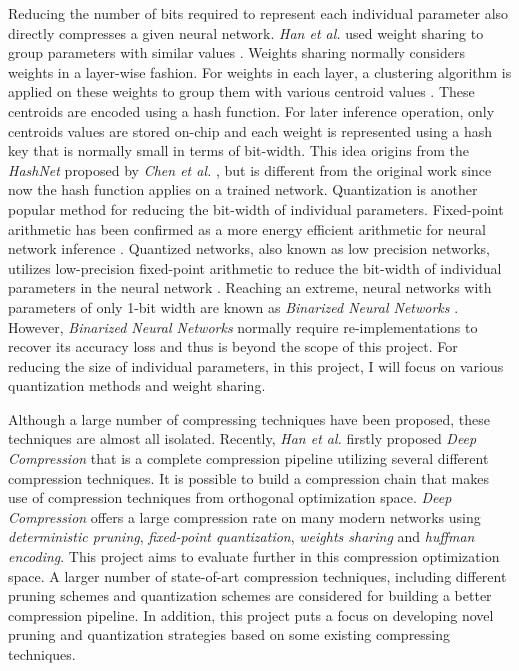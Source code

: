 \documentclass[a4paper,12pt]{report}
\begin{document}
Reducing the number of bits required to represent each individual parameter also
directly compresses a given neural network.
\textit{Han et al.} used weight sharing to group parameters with similar values \cite{Han15}.
Weights sharing normally considers weights in a layer-wise fashion.
For weights in each layer, a clustering algorithm is applied on these
weights to group them with various centroid values \cite{Han15}.
These centroids are encoded using a hash function.
For later inference operation, only centroids values are stored on-chip and
each weight is represented using a hash key that is normally small in terms of
bit-width.
This idea origins from the \textit{HashNet} proposed by \textit{Chen et al.} \cite{chen2015compressing},
but is different from the original work since now the hash function applies on a trained network.
Quantization is another popular method for reducing the bit-width of individual parameters.
Fixed-point arithmetic has been confirmed as a more energy efficient arithmetic
for neural network inference \cite{moons2016energy}.
Quantized networks, also known as low precision networks, utilizes low-precision
fixed-point arithmetic to reduce the bit-width of individual parameters in the
neural network \cite{Hubara}.
Reaching an extreme, neural networks with parameters of only 1-bit width are
known as \textit{Binarized Neural Networks} \cite{Courbariaux}.
However, \textit{Binarized Neural Networks} normally require re-implementations to recover
its accuracy loss and thus is beyond the scope of this project.
For reducing the size of individual parameters, in this project, I will focus on
various quantization methods and weight sharing.

Although a large number of compressing techniques have been proposed, these
techniques are almost all isolated.
Recently, \textit{Han et al.} firstly proposed \textit{Deep Compression} that is
a complete compression pipeline utilizing several different compression techniques.
It is possible to build a compression chain that makes use of compression techniques
from orthogonal optimization space.
\textit{Deep Compression} offers a large compression rate on many modern networks
using \textit{deterministic pruning}, \textit{fixed-point quantization},
\textit{weights sharing} and \textit{huffman encoding}.
This project aims to evaluate further in this compression optimization space.
A larger number of state-of-art compression techniques, including different pruning
schemes and quantization schemes are considered for building a better compression pipeline.
In addition, this project puts a focus on developing novel pruning and
quantization strategies based on some existing compressing techniques.
\end{document}
